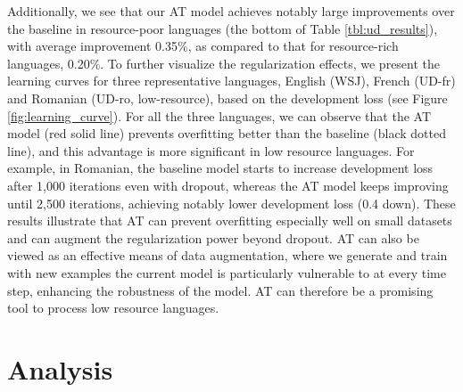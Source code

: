 \documentclass[11pt,a4paper]{article}
\begin{document}
Additionally, we see that our AT model achieves notably large improvements over the baseline in resource-poor languages (the bottom of Table \ref{tbl:ud_results}), with average improvement 0.35\%, as compared to that for resource-rich languages, 0.20\%.
To further visualize the regularization effects, we present the learning curves for three representative languages, English (WSJ), French (UD-fr) and Romanian (UD-ro, low-resource), based on the development loss (see Figure \ref{fig:learning_curve}).
For all the three languages, we can observe that the AT model (red solid line) prevents overfitting better than the baseline (black dotted line), and this advantage is more significant in low resource languages.
For example, in Romanian, %
the baseline model starts to increase development loss after 1,000 iterations even with dropout, whereas the AT model keeps improving until 2,500 iterations, achieving notably lower development loss (0.4 down).
These results illustrate that AT can prevent overfitting especially well on small datasets and can augment the regularization power beyond dropout.
AT can also be viewed as an effective means of data augmentation, where we generate and train with new examples the current model is particularly vulnerable to at every time step, enhancing the robustness of the model.
AT can therefore be a promising tool to process low resource languages.



\section{Analysis}
\end{document}
